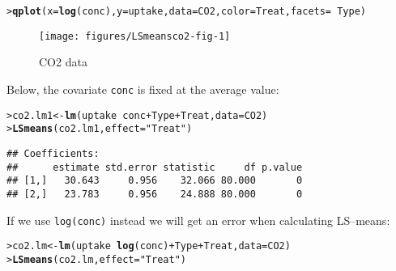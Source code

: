 \documentclass[11pt]{article}\usepackage[]{graphicx}\usepackage[]{color}
\makeatletter
\def\maxwidth{ %
  \ifdim\Gin@nat@width>\linewidth
    \linewidth
  \else
    \Gin@nat@width
  \fi
}
\newcommand{\hlstr}[1]{\textcolor[rgb]{0.192,0.494,0.8}{#1}}%
\newcommand{\hlopt}[1]{\textcolor[rgb]{0,0,0}{#1}}%
\newcommand{\hlstd}[1]{\textcolor[rgb]{0.345,0.345,0.345}{#1}}%
\newcommand{\hlkwb}[1]{\textcolor[rgb]{0.69,0.353,0.396}{#1}}%
\newcommand{\hlkwc}[1]{\textcolor[rgb]{0.333,0.667,0.333}{#1}}%
\newcommand{\hlkwd}[1]{\textcolor[rgb]{0.737,0.353,0.396}{\textbf{#1}}}%
\newenvironment{kframe}{%
 \def\at@end@of@kframe{}%
 \ifinner\ifhmode%
  \def\at@end@of@kframe{\end{minipage}}%
  \begin{minipage}{\columnwidth}%
 \fi\fi%
 \def\FrameCommand##1{\hskip\@totalleftmargin \hskip-\fboxsep
 \colorbox{shadecolor}{##1}\hskip-\fboxsep
     \hskip-\linewidth \hskip-\@totalleftmargin \hskip\columnwidth}%
 \MakeFramed {\advance\hsize-\width
   \@totalleftmargin\z@ \linewidth\hsize
   \@setminipage}}%
 {\par\unskip\endMakeFramed%
 \at@end@of@kframe}
\newenvironment{knitrout}{}{} %
\def\code#1{\texttt{#1}}
\renewenvironment{knitrout}{
  \begin{oldknitrout}
    \footnotesize
    \topsep=0pt
}{
  \end{oldknitrout}
}
\makeatother
\begin{document}
\begin{knitrout}
\color{fgcolor}\begin{kframe}
\begin{alltt}
\hlstd{> }\hlkwd{qplot}\hlstd{(}\hlkwc{x}\hlstd{=}\hlkwd{log}\hlstd{(conc),} \hlkwc{y}\hlstd{=uptake,} \hlkwc{data}\hlstd{=CO2,} \hlkwc{color}\hlstd{=Treat,} \hlkwc{facets}\hlstd{=}\hlopt{~}\hlstd{Type)}
\end{alltt}
\end{kframe}\begin{figure}
\texttt{[image: figures/LSmeansco2-fig-1]} \caption[CO2 data]{CO2 data}\label{fig:co2-fig}
\end{figure}

\end{knitrout}


Below, the covariate \code{conc} is fixed at the average value:
\begin{knitrout}
\color{fgcolor}\begin{kframe}
\begin{alltt}
\hlstd{> }\hlstd{co2.lm1} \hlkwb{<-} \hlkwd{lm}\hlstd{(uptake} \hlopt{~} \hlstd{conc} \hlopt{+} \hlstd{Type} \hlopt{+} \hlstd{Treat,} \hlkwc{data}\hlstd{=CO2)}
\hlstd{> }\hlkwd{LSmeans}\hlstd{(co2.lm1,} \hlkwc{effect}\hlstd{=}\hlstr{"Treat"}\hlstd{)}
\end{alltt}
\begin{verbatim}
## Coefficients:
##      estimate std.error statistic     df p.value
## [1,]   30.643     0.956    32.066 80.000       0
## [2,]   23.783     0.956    24.888 80.000       0
\end{verbatim}
\end{kframe}
\end{knitrout}

If we use \code{log(conc)} instead we will get an error when
calculating LS--means:
\begin{knitrout}
\color{fgcolor}\begin{kframe}
\begin{alltt}
\hlstd{> }\hlstd{co2.lm} \hlkwb{<-} \hlkwd{lm}\hlstd{(uptake} \hlopt{~} \hlkwd{log}\hlstd{(conc)} \hlopt{+} \hlstd{Type} \hlopt{+} \hlstd{Treat,} \hlkwc{data}\hlstd{=CO2)}
\hlstd{> }\hlkwd{LSmeans}\hlstd{(co2.lm,} \hlkwc{effect}\hlstd{=}\hlstr{"Treat"}\hlstd{)}
\end{alltt}
\end{kframe}
\end{knitrout}
\end{document}
